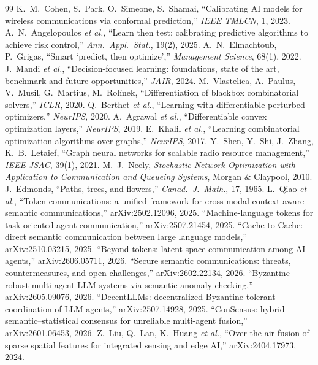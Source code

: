 \documentclass[11pt,a4paper]{article}
\begin{document}
\begin{thebibliography}{99}
 K.~M.~Cohen, S.~Park, O.~Simeone, S.~Shamai, ``Calibrating AI models for wireless communications via conformal prediction,'' \emph{IEEE TMLCN}, 1, 2023.
 A.~N.~Angelopoulos \emph{et al.}, ``Learn then test: calibrating predictive algorithms to achieve risk control,'' \emph{Ann.\ Appl.\ Stat.}, 19(2), 2025.
 A.~N.~Elmachtoub, P.~Grigas, ``Smart `predict, then optimize','' \emph{Management Science}, 68(1), 2022.
 J.~Mandi \emph{et al.}, ``Decision-focused learning: foundations, state of the art, benchmark and future opportunities,'' \emph{JAIR}, 2024.
 M.~Vlastelica, A.~Paulus, V.~Musil, G.~Martius, M.~Rol\'inek, ``Differentiation of blackbox combinatorial solvers,'' \emph{ICLR}, 2020.
 Q.~Berthet \emph{et al.}, ``Learning with differentiable perturbed optimizers,'' \emph{NeurIPS}, 2020.
 A.~Agrawal \emph{et al.}, ``Differentiable convex optimization layers,'' \emph{NeurIPS}, 2019.
 E.~Khalil \emph{et al.}, ``Learning combinatorial optimization algorithms over graphs,'' \emph{NeurIPS}, 2017.
 Y.~Shen, Y.~Shi, J.~Zhang, K.~B.~Letaief, ``Graph neural networks for scalable radio resource management,'' \emph{IEEE JSAC}, 39(1), 2021.
 M.~J.~Neely, \emph{Stochastic Network Optimization with Application to Communication and Queueing Systems}, Morgan \& Claypool, 2010.
 J.~Edmonds, ``Paths, trees, and flowers,'' \emph{Canad.\ J.\ Math.}, 17, 1965.
 L.~Qiao \emph{et al.}, ``Token communications: a unified framework for cross-modal context-aware semantic communications,'' arXiv:2502.12096, 2025.
 ``Machine-language tokens for task-oriented agent communication,'' arXiv:2507.21454, 2025.
 ``Cache-to-Cache: direct semantic communication between large language models,'' arXiv:2510.03215, 2025.
 ``Beyond tokens: latent-space communication among AI agents,'' arXiv:2606.05711, 2026.
 ``Secure semantic communications: threats, countermeasures, and open challenges,'' arXiv:2602.22134, 2026.
 ``Byzantine-robust multi-agent LLM systems via semantic anomaly checking,'' arXiv:2605.09076, 2026.
 ``DecentLLMs: decentralized Byzantine-tolerant coordination of LLM agents,'' arXiv:2507.14928, 2025.
 ``ConSensus: hybrid semantic--statistical consensus for unreliable multi-agent fusion,'' arXiv:2601.06453, 2026.
 Z.~Liu, Q.~Lan, K.~Huang \emph{et al.}, ``Over-the-air fusion of sparse spatial features for integrated sensing and edge AI,'' arXiv:2404.17973, 2024.

\end{thebibliography}
\end{document}
